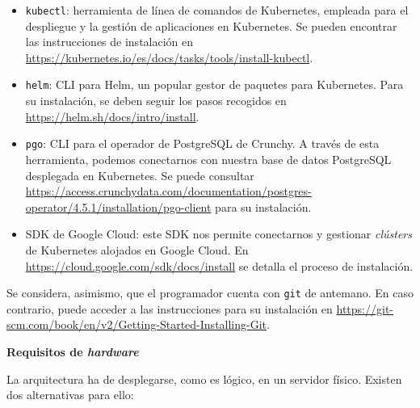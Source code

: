 \vspace{-0.2cm}
\begin{itemize} [\textbullet]
	\item \texttt{kubectl}: herramienta de línea de comandos de Kubernetes, empleada para el despliegue y la gestión de aplicaciones en Kubernetes. Se pueden encontrar las instrucciones de instalación en \href{https://kubernetes.io/es/docs/tasks/tools/install-kubectl}{https://kubernetes.io/es/\newline docs/tasks/tools/install-kubectl}.
	
	\item \texttt{helm}: CLI para Helm, un popular gestor de paquetes para Kubernetes. Para su instalación, se deben seguir los pasos recogidos en \href{https://helm.sh/docs/intro/install}{https://helm.sh/docs/intro/install}.
	
	\item \texttt{pgo}: CLI para el operador de PostgreSQL de Crunchy. A través de esta herramienta, podemos conectarnos con nuestra base de datos PostgreSQL desplegada en Kubernetes. Se puede consultar \href{https://access.crunchydata.com/documentation/postgres-operator/4.5.1/installation/pgo-client}{https://access.\newline crunchydata.com/documentation/postgres-operator/4.5.1/installation/\newline pgo-client} para su instalación.
	
	\item SDK de Google Cloud: este SDK nos permite conectarnos y gestionar \emph{clústers} de Kubernetes alojados en Google Cloud. En \href{https://cloud.google.com/sdk/docs/install}{https://cloud.\newline google.com/sdk/docs/install} se detalla el proceso de instalación.

\end{itemize}

Se considera, asimismo, que el programador cuenta con \texttt{git} de antemano. En caso contrario, puede acceder a las instrucciones para su instalación en \href{https://git-scm.com/book/en/v2/Getting-Started-Installing-Git}{https://git-scm.com/book/en/v2/Getting-Started-Installing-Git}.

\vspace{0.3cm}
\noindent
\textbf{Requisitos de \emph{hardware}}

La arquitectura ha de desplegarse, como es lógico, en un servidor físico. Existen dos alternativas para ello:

